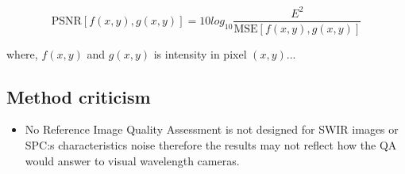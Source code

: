 \begin{equation}
    \text{PSNR}[f(x,y),g(x,y)] = 10 log_{10}\frac{E^2}{\text{MSE}[f(x,y),g(x,y)]}
\end{equation}
 
where, $f(x,y)$ and $g(x,y)$ is intensity in pixel $(x,y)$...
 








\subsection{Method criticism}
\begin{itemize}
    \item No Reference Image Quality Assessment is not designed for SWIR images or SPC:s characteristics noise therefore the results may not reflect how the QA would answer to visual wavelength cameras. 
\end{itemize}

